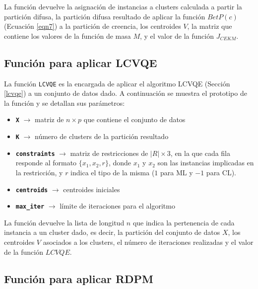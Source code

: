 La función devuelve la asignación de instancias a clusters calculada a partir la partición difusa, la partición difusa resultado de aplicar la función $BetP(c)$ (Ecuación \ref{eqn7}) a la partición de creencia, los centroides $V$, la matriz que contiene los valores de la función de masa $M$, y el valor de la función $J_{CEKM}$.

\subsection{Función para aplicar LCVQE}

La función \texttt{LCVQE} es la encargada de aplicar el algoritmo \acs{LCVQE} (Sección \ref{lcvqe}) a un conjunto de datos dado. A continuación se muestra el prototipo de la función y se detallan sus parámetros:


\begin{itemize}
	
	\item \textbf{\texttt{X}} {$\longrightarrow$ matriz de $n \times p$ que contiene el conjunto de datos}
	
	\item \textbf{\texttt{K}} {$\longrightarrow$ número de clusters de la partición resultado}
	
	\item \textbf{\texttt{constraints}} {$\longrightarrow$ matriz de restricciones de $|R| \times 3$, en la que cada fila responde al formato $\{x_1, x_2, r\}$, donde $x_1$ y $x_2$ son las instancias implicadas en la restricción, y $r$ indica el tipo de la misma ($1$ para \acs{ML} y $-1$ para \acs{CL}).}
	
	\item \textbf{\texttt{centroids}} {$\longrightarrow$ centroides iniciales}
	
	\item \textbf{\texttt{max\_iter}} {$\longrightarrow$ límite de iteraciones para el algoritmo}
	
\end{itemize}

La función devuelve la lista de longitud $n$ que indica la pertenencia de cada instancia a un cluster dado, es decir, la partición del conjunto de datos $X$, los centroides $V$ asociados a los clusters, el número de iteraciones realizadas y el valor de la función $LCVQE$.

\subsection{Función para aplicar RDPM}

